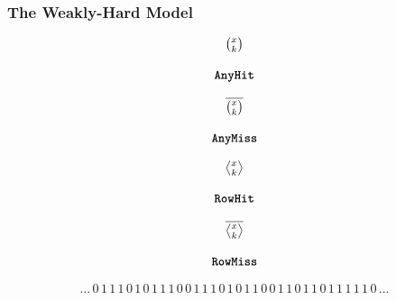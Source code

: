 \begin{frame}
    \frametitle{The Weakly-Hard Model}
    \begin{minipage}[c]{0.24\textwidth}
        \centering
        \begin{equation*}
            \begin{matrix}
                {\Large \binom{x_{}}{k_{}}}   \\
                            \\
                \texttt{\textbf{AnyHit}}{}
            \end{matrix}
        \end{equation*}
    \end{minipage}\hfill
    \begin{minipage}[c]{0.24\textwidth}
        \centering
        \begin{equation*}
            \begin{matrix}
                {\Large \overline{\binom{x_{}}{k_{}}}}   \\
                            \\
                \texttt{\textbf{AnyMiss}}{}
            \end{matrix}
        \end{equation*}
    \end{minipage}\hfill
    \begin{minipage}[c]{0.24\textwidth}
        \centering
        \begin{equation*}
            \begin{matrix}
                {\Large \rowhit{}}   \\
                            \\
                \tRH{}
            \end{matrix}
        \end{equation*}
    \end{minipage}\hfill
    \begin{minipage}[c]{0.24\textwidth}
        \centering
        \begin{equation*}
            \begin{matrix}
                {\Large \rowmiss{}}   \\
                            \\
                \tRM{}
            \end{matrix}
        \end{equation*}
    \end{minipage}

    \vspace{1cm}

    \begin{equation*}
        \ldots\, 0\, 1\, 1\, 1\, 0\, 1\, 0\, 1\, 1\, 1\, 0\, 0\, 1\, 1\, 1\, 0\, 1\, 0\, 1\, 1\, 0\, 0\, 1\, 1\, 0\, 1\, 1\, 0\, 1\, 1\, 1\, 1\, 1\, 0\, \ldots
    \end{equation*}
\end{frame}


